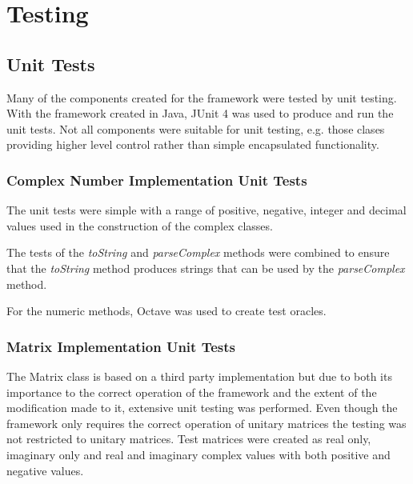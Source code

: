 \chapter{Testing}
\label{sec:testing}
\section{Unit Tests}
\label{sec:unittests}
Many of the components created for the framework were tested by unit testing.
With the framework created in Java, JUnit 4\cite{junitweb} was used to produce and run the unit tests.
Not all components were suitable for unit testing, e.g. those clases providing higher level control rather than simple encapsulated functionality.


\subsection{Complex Number Implementation Unit Tests}
The unit tests were simple with a range of positive, negative, integer and decimal values used in the construction of the complex classes.

The tests of the \emph{toString} and \emph{parseComplex} methods were combined to ensure that the \emph{toString} method produces strings that can be used by the \emph{parseComplex} method.

For the numeric methods, Octave\cite{octweb} was used to create test oracles.

\subsection{Matrix Implementation Unit Tests}
The Matrix class is based on a third party implementation but due to both its importance to the correct operation of the framework and the extent of the modification made to it, extensive unit testing was performed.
Even though the framework only requires the correct operation of unitary matrices the testing was not restricted to unitary matrices.
Test matrices were created as real only,  imaginary only and real and imaginary complex values with both positive and negative values.

